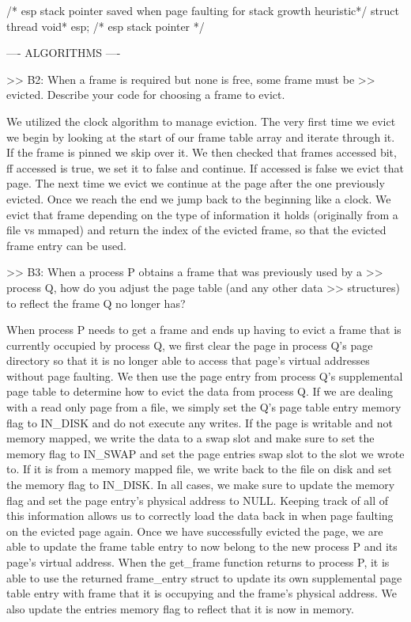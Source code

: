 /* esp stack pointer saved when page faulting for stack growth heuristic*/
struct thread
{
    void* esp;                  /* esp stack pointer */
}

---- ALGORITHMS ----

>> B2: When a frame is required but none is free, some frame must be
>> evicted.  Describe your code for choosing a frame to evict.

 We utilized the clock algorithm to manage eviction. The very first time
 we evict we begin by looking at the start of our frame table array and iterate
 through it. If the frame is pinned we skip over it. We then checked that frames
 accessed bit, ff accessed is true, we set it to false and continue. If
 accessed is false we evict that page. The next time we evict we continue
 at the page after the one previously evicted. Once we reach the end we jump
 back to the beginning like a clock. We evict that frame depending on the
 type of information it holds (originally from a file vs mmaped) and return
 the index of the evicted frame, so that the evicted frame entry can be used.


>> B3: When a process P obtains a frame that was previously used by a
>> process Q, how do you adjust the page table (and any other data
>> structures) to reflect the frame Q no longer has?


When process P needs to get a frame and ends up having to evict a frame that
is currently occupied by process Q, we first clear the page in process Q's
page directory so that it is no longer able to access that page's virtual
addresses without page faulting. We then use the page entry from process Q's
supplemental page table to determine how to evict the data from process Q.
If we are dealing with a read only page from a file, we simply set the Q's
page table entry memory flag to IN_DISK and do not execute any writes. If
the page is writable and not memory mapped, we write the data to a swap slot
and make sure to set the memory flag to IN_SWAP and set the page entries
swap slot to the slot we wrote to. If it is from a memory mapped file, we
write back to the file on disk and set the memory flag to IN_DISK. In all
cases, we make sure to update the memory flag and set the page entry's
physical address to NULL. Keeping track of all of this information allows
us to correctly load the data back in when page faulting on the evicted page
again. Once we have successfully evicted the page, we are able to update the
frame table entry to now belong to the new process P and its page's virtual
address. When the get_frame function returns to process P, it is able to use
the returned frame_entry struct to update its own supplemental page table
entry with frame that it is occupying and the frame's physical address. We
also update the entries memory flag to reflect that it is now in memory.

